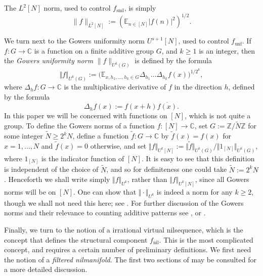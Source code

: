 \documentclass[11pt,reqno]{amsart}
\numberwithin{equation}{section}
\theoremstyle{plain}
\theoremstyle{definition}
\renewcommand{\geq}{\geqslant}
\newcommand\E{{\mathbb{E}}}
\newcommand\Z{\mathbb{Z}}
\newcommand\C{\mathbb{C}}
\newcommand\1{{\bf 1}}
\newcommand\2{{\bf 2}}
\newcommand\nil{{\operatorname{nil}}}
\newcommand\sml{{\operatorname{sml}}}
\newcommand\unf{{\operatorname{unf}}}
\begin{document}
The $L^2[N]$ norm, used to control $f_\sml$, is simply
$$ \|f\|_{L^2[N]} := (\E_{n \in [N]} |f(n)|^2)^{1/2}.$$

We turn next to the Gowers uniformity norm $U^{s+1}[N]$, used to control $f_\unf$.
If $f : G \rightarrow \C$ is a function on a finite additive group $G$, and $k \geq 1$ is an integer, then the \emph{Gowers uniformity norm} $\|f\|_{U^k(G)}$ is defined by the formula
\[ \Vert f \Vert_{U^{k}(G)} := \big(  \E_{x,h_1,\dots,h_k \in G} \Delta_{h_1} \dots \Delta_{h_k}  f(x) \big)^{1/2^k},\]
where $\Delta_h f: G \to \C$ is the multiplicative derivative of $f$ in the direction $h$, defined by the formula
\[ \Delta_h f(x) := f(x+h) \overline{f(x)}.\] 
In this paper we will be concerned with functions on $[N]$, which is not quite a group. To define the Gowers norms of a function $f : [N] \rightarrow \C$, set $G := \Z/\tilde N\Z$ for some integer $\tilde N \geq 2^k N$, define a function $\tilde f : G \rightarrow \C$ by $\tilde f(x) = f(x)$ for $x = 1,\dots,N$ and $\tilde f(x) = 0$ otherwise, and set $\Vert f \Vert_{U^k[N]} := \Vert \tilde f \Vert_{U^k(G)}/\Vert 1_{[N]}\Vert_{U^k(G)}$, where $1_{[N]}$ is the indicator function of $[N]$. It is easy to see that this definition is independent of the choice of $\tilde N$, and so for definiteness one could take $\tilde N := 2^k N$. 
Henceforth we shall write simply $\Vert f \Vert_{U^k}$, rather than $\Vert f \Vert_{U^k[N]}$, since all Gowers norms will be on $[N]$. One can show that $\Vert \cdot \Vert_{U^k}$ is indeed a norm for any $k \geq 2$, though we shall not need this here; see \cite{gowers-longaps}.  For further discussion of the Gowers norms and their relevance to counting additive patterns see \cite{gowers-longaps}, \cite[\S 5]{green-tao-longprimeaps} or \cite[\S 11]{tao-vu}.


Finally, we turn to the notion of a irrational virtual nilsequence, which is the concept that defines the structural component $f_\nil$.  This is the most complicated concept, and requires a certain number of preliminary definitions.  We first need the notion of a \emph{filtered nilmanifold}. The first two sections of \cite{green-tao-nilratner} may be consulted for a more detailed discussion.
\end{document}
